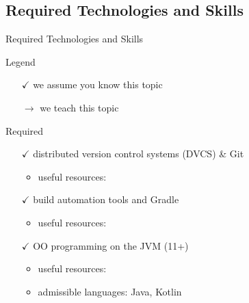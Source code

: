 \documentclass[presentation]{beamer}\mode<presentation>{\usetheme{AMSBolognaFC}}
\begin{document}
\subsection{Required Technologies and Skills}

\begin{frame}[c,allowframebreaks]{Required Technologies and Skills}

\begin{block}{Legend}
	\begin{multicols}{2}
		\begin{itemize}
			\item[$\checkmark$] we assume you know this topic
			\item[$\rightarrow$] we teach this topic
		\end{itemize}
	\end{multicols}
\end{block}

\framebreak

\begin{alertblock}{Required}
	\begin{itemize}
		\item[$\checkmark$] distributed version control systems (DVCS) \& \alert{Git}
		\begin{itemize}
			\item useful resources: 
		\end{itemize}

		\vfill

		\item[$\checkmark$] build automation tools and \alert{Gradle}
		\begin{itemize}
			\item useful resources: 
		\end{itemize}
		
		\vfill

		\item[$\checkmark$] OO programming on the JVM (11+)
		\begin{itemize}
			\item useful resources:  %
			\item admissible languages: Java, \alert{Kotlin}
		\end{itemize}

		\vfill


\end{itemize}
\end{alertblock}
\end{frame}
\end{document}
